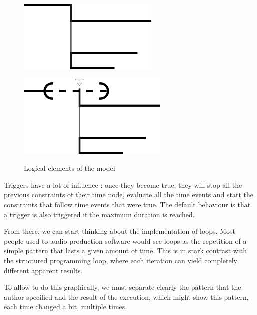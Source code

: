 \documentclass{sigchi}
\begin{document}
\begin{figure}[h]
	\centering
	\begin{minipage}[b]{.5\linewidth}
		\centering
		\includegraphics[scale=0.6]{images/events.png}
		\label{fig.logical.events}
	\end{minipage}\begin{minipage}[b]{.5\linewidth}
	\centering
	\includegraphics[scale=0.6]{images/trigger.png}
	\label{fig.logical.trigger}
    \end{minipage}	

\caption{Logical elements of the model}
\label{fig.logical}
\end{figure}	

Triggers have a lot of influence : once they become true, they will stop all the previous constraints of their time node, evaluate all the time events and start the constraints that follow time events that were true. The default behaviour is that a trigger is also triggered if the maximum duration is reached.

From there, we can start thinking about the implementation of loops. Most people used to audio production software would see loops as the repetition of a simple pattern that lasts a given amount of time. This is in stark contrast with the structured programming loop, where each iteration can yield completely different apparent results.

To allow to do this graphically, we must separate clearly the pattern that the author specified and the result of the execution, which might show this pattern, each time changed a bit, multiple times.
\end{document}

